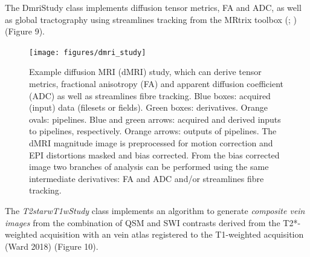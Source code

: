 The DmriStudy class implements diffusion tensor metrics, FA and ADC, as
well as global tractography using streamlines tracking from the MRtrix
toolbox (\cite{tournier_improved_2010}; \cite{tournier_mrtrix:_2012}) (Figure 9).


\begin{figure}
  \begin{center}
    \texttt{[image: figures/dmri\_study]}
  \caption{Example diffusion MRI (dMRI) study, which can derive
tensor metrics, fractional anisotropy (FA) and apparent diffusion
coefficient (ADC) as well as streamlines fibre tracking. Blue boxes:
acquired (input) data (filesets or fields). Green boxes: derivatives.
Orange ovals: pipelines. Blue and green arrows: acquired and derived
inputs to pipelines, respectively. Orange arrows: outputs of pipelines.
The dMRI magnitude image is preprocessed for motion correction and EPI
distortions masked and bias corrected. From the bias corrected image two
branches of analysis can be performed using the same intermediate
derivatives: FA and ADC and/or streamlines fibre tracking.}
\end{center}
\label{fig:dmri_study}
\end{figure}

The \emph{T2starwT1wStudy} class implements an algorithm to generate
\emph{composite vein images} from the combination of QSM and SWI
contrasts derived from the T2*-weighted acquisition with an vein atlas
registered to the T1-weighted acquisition (Ward 2018) (Figure 10).


